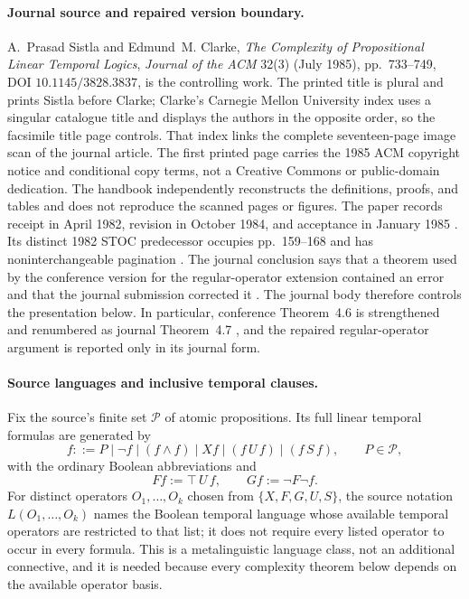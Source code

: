 \paragraph{Journal source and repaired version boundary.}
A.~Prasad Sistla and Edmund~M. Clarke,
\emph{The Complexity of Propositional Linear Temporal Logics},
\emph{Journal of the ACM} 32(3) (July 1985), pp.~733--749, DOI
\(10.1145/3828.3837\), is the controlling work.  The printed title is plural
and prints Sistla before Clarke; Clarke's Carnegie Mellon University index
uses a singular catalogue title and displays the authors in the opposite
order, so the facsimile title page controls.  That index links the complete
seventeen-page image scan of the journal article.
The first printed page carries the 1985 ACM copyright notice and conditional
copy terms, not a Creative Commons or public-domain dedication.  The
handbook independently reconstructs the definitions, proofs, and tables and
does not reproduce the scanned pages or figures.
The paper records receipt in April 1982, revision in October 1984, and
acceptance in January 1985 \cite[p.~749]{SistlaClarke1985}.  Its distinct 1982
STOC predecessor occupies pp.~159--168 and has noninterchangeable pagination
\cite[pp.~159--168]{SistlaClarke1982}.  The journal conclusion says that a
theorem used by the conference version for the regular-operator extension
contained an error and that the journal submission corrected it
\cite[p.~748]{SistlaClarke1985}.  The journal body therefore controls the
presentation below.  In particular, conference Theorem~4.6
\cite[p.~165]{SistlaClarke1982} is strengthened and renumbered as journal
Theorem~4.7 \cite[pp.~743--744]{SistlaClarke1985}, and the repaired
regular-operator argument is reported only in its journal form.

\paragraph{Source languages and inclusive temporal clauses.}
Fix the source's finite set \(\mathcal P\) of atomic propositions.  Its full
linear temporal formulas are generated by
\[
 f::=P\mid\neg f\mid(f\land f)\mid Xf\mid(f\,U\,f)\mid(f\,S\,f),
 \qquad P\in\mathcal P,
\]
with the ordinary Boolean abbreviations and
\[
 Ff:=\top\,U\,f,
 \qquad
 Gf:=\neg F\neg f.
\]
For distinct operators \(O_1,\ldots,O_k\) chosen from
\(\{X,F,G,U,S\}\), the source notation \(L(O_1,\ldots,O_k)\) names the
Boolean temporal language whose available temporal operators are restricted
to that list; it does not require every listed operator to occur in every
formula.
This is a metalinguistic language class, not an additional connective, and it
is needed because every complexity theorem below depends on the available
operator basis.

